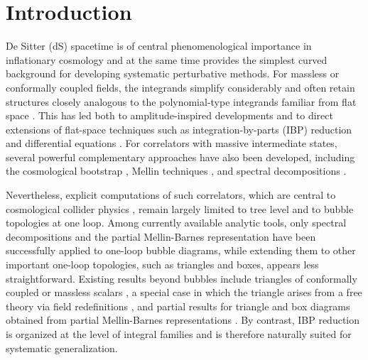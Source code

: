 \documentclass[%
 reprint,
 amsmath,amssymb,
 aps,
prd,
]{revtex4-2}
\begin{document}
\section{Introduction}

De Sitter (dS) spacetime is of central phenomenological importance in inflationary cosmology \cite{Achucarro:2022qrl} and at the same time provides the simplest curved background for developing systematic perturbative methods. For massless or conformally coupled fields, the integrands simplify considerably and often retain structures closely analogous to the polynomial-type integrands familiar from flat space \cite{Arkani-Hamed:2024jbp,Arkani-Hamed:2023kig,Arkani-Hamed:2023bsv,Benincasa:2022gtd,Benincasa:2024leu,Benincasa:2024lxe,Fan:2024iek,Benincasa:2024ptf,Baumann:2024mvm,He:2024olr,Chowdhury:2025ohm,De:2023xue,De:2025bmf,Glew:2025otn,Glew:2025ypb,Pimentel:2026kqc}. This has led both to amplitude-inspired developments \cite{Arkani-Hamed:2017fdk,Arkani-Hamed:2018bjr,Lee:2022fgr,Gomez:2021qfd,Gomez:2021ujt,Armstrong:2022mfr,Tao:2022nqc,Chen:2023bji,Chen:2023xlt} and to direct extensions of flat-space techniques such as integration-by-parts (IBP) reduction \cite{Chetyrkin:1981qh} and differential equations \cite{Kotikov:1990kg,Kotikov:1991pm,Gehrmann:1999as,Bern:1993kr}. For correlators with massive intermediate states, several powerful complementary approaches have also been developed, including the cosmological bootstrap \cite{Arkani-Hamed:2018kmz,Baumann:2019oyu,Baumann:2020dch,Pajer:2020wnj,Pajer:2020wxk,Cabass:2021fnw,Baumann:2022jpr,Pimentel:2022fsc,Jazayeri:2022kjy,Qin:2022fbv,Wang:2022eop,Qin:2023ejc,Aoki:2024uyi,Liu:2024str,
Qin:2025xct,Xianyu:2025lbk}, Mellin techniques \cite{Sleight:2019mgd,Sleight:2019hfp,Sleight:2020obc,Sleight:2021plv,Premkumar:2021mlz,Qin:2022lva,Qin:2022fbv,Xianyu:2023ytd,Qin:2024gtr}, and spectral decompositions \cite{Marolf:2010zp,Xianyu:2022jwk,Loparco:2023rug,Werth:2024mjg,
Qin:2025xct,Zhang:2025nzd,Altshuler:2025qmk}.

Nevertheless, explicit computations of such correlators, which are central to cosmological collider physics \cite{Chen:2009we,Chen:2009zp,Baumann:2011nk,Noumi:2012vr,Arkani-Hamed:2015bza}, remain largely limited to tree level and to bubble topologies at one loop. Among currently available analytic tools, only spectral decompositions \cite{Xianyu:2022jwk,Zhang:2025nzd,Cespedes:2025ple} and the partial Mellin-Barnes representation \cite{Qin:2024gtr} have been successfully applied to one-loop bubble diagrams, while extending them to other important one-loop topologies, such as triangles and boxes, appears less straightforward. Existing results beyond bubbles include triangles of conformally coupled or massless scalars \cite{Pimentel:2026kqc}, a special case in which the triangle arises from a free theory via field redefinitions \cite{Wang:2025qfh}, and partial results for triangle and box diagrams obtained from partial Mellin-Barnes representations \cite{Qin:2023bjk}. By contrast, IBP reduction is organized at the level of integral families and is therefore naturally suited for systematic generalization.
\end{document}

